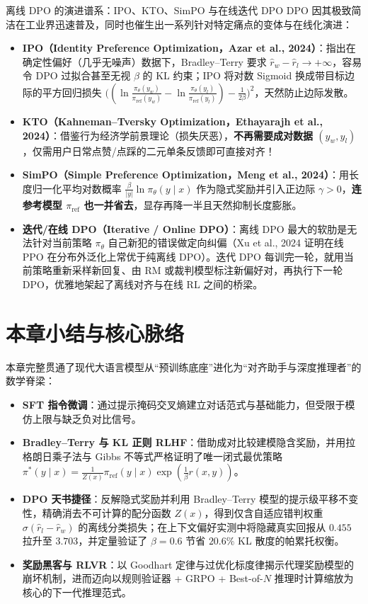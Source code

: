 \begin{extBox}{离线 DPO 的演进谱系：IPO、KTO、SimPO 与在线迭代 DPO}
DPO 因其极致简洁在工业界迅速普及，同时也催生出一系列针对特定痛点的变体与在线化演进：
\begin{itemize}
  \item \textbf{IPO（Identity Preference Optimization，Azar et al., 2024）}：指出在确定性偏好（几乎无噪声）数据下，Bradley--Terry 要求 $\hat{r}_w - \hat{r}_l \to +\infty$，容易令 DPO 过拟合甚至无视 $\beta$ 的 KL 约束；IPO 将对数 Sigmoid 换成带目标边际的平方回归损失 $\big((\ln\frac{\pi_\theta(y_w)}{\pi_{\mathrm{ref}}(y_w)} - \ln\frac{\pi_\theta(y_l)}{\pi_{\mathrm{ref}}(y_l)}) - \frac{1}{2\beta}\big)^2$，天然防止边际发散。
  \item \textbf{KTO（Kahneman--Tversky Optimization，Ethayarajh et al., 2024）}：借鉴行为经济学前景理论（损失厌恶），\textbf{不再需要成对数据 $(y_w, y_l)$}，仅需用户日常点赞/点踩的二元单条反馈即可直接对齐！
  \item \textbf{SimPO（Simple Preference Optimization，Meng et al., 2024）}：用长度归一化平均对数概率 $\frac{\beta}{|y|}\ln\pi_\theta(y\mid x)$ 作为隐式奖励并引入正边际 $\gamma > 0$，\textbf{连参考模型 $\pi_{\mathrm{ref}}$ 也一并省去}，显存再降一半且天然抑制长度膨胀。
  \item \textbf{迭代/在线 DPO（Iterative / Online DPO）}：离线 DPO 最大的软肋是无法针对当前策略 $\pi_\theta$ 自己新犯的错误做定向纠偏（Xu et al., 2024 证明在线 PPO 在分布外泛化上常优于纯离线 DPO）。迭代 DPO 每训完一轮，就用当前策略重新采样新回复、由 RM 或裁判模型标注新偏好对，再执行下一轮 DPO，优雅地架起了离线对齐与在线 RL 之间的桥梁。
\end{itemize}
\end{extBox}

\section*{本章小结与核心脉络}

本章完整贯通了现代大语言模型从“预训练底座”进化为“对齐助手与深度推理者”的数学脊梁：
\begin{itemize}
  \item \textbf{SFT 指令微调}：通过提示掩码交叉熵建立对话范式与基础能力，但受限于模仿上限与缺乏负对比信号。
  \item \textbf{Bradley--Terry 与 KL 正则 RLHF}：借助成对比较建模隐含奖励，并用拉格朗日乘子法与 Gibbs 不等式严格证明了唯一闭式最优策略 $\pi^*(y\mid x) = \frac{1}{Z(x)}\pi_{\mathrm{ref}}(y\mid x)\exp(\frac{1}{\beta}r(x,y))$。
  \item \textbf{DPO 天书捷径}：反解隐式奖励并利用 Bradley--Terry 模型的提示级平移不变性，精确消去不可计算的配分函数 $Z(x)$，得到仅含自适应错判权重 $\sigma(\hat{r}_l - \hat{r}_w)$ 的离线分类损失；在上下文偏好实测中将隐藏真实回报从 $0.455$ 拉升至 $3.703$，并定量验证了 $\beta=0.6$ 节省 $20.6\%$ KL 散度的帕累托权衡。
  \item \textbf{奖励黑客与 RLVR}：以 Goodhart 定律与过优化标度律揭示代理奖励模型的崩坏机制，进而迈向以规则验证器 + GRPO + Best-of-$N$ 推理时计算缩放为核心的下一代推理范式。
\end{itemize}

